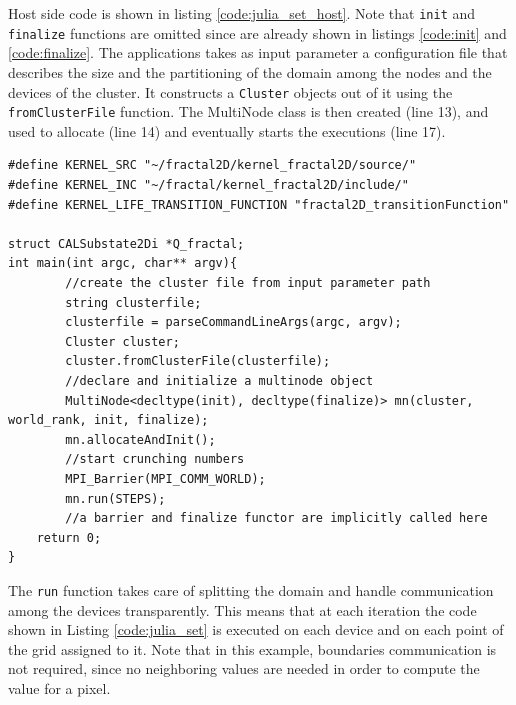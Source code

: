 Host side code is shown in listing \ref{code:julia_set_host}. Note that \texttt{init} and \texttt{finalize} functions are omitted since are already shown in listings \ref{code:init} and \ref{code:finalize}.
The applications takes as input parameter a configuration file that describes the size and the partitioning of the domain among the nodes and the devices of the cluster. It constructs a \texttt{Cluster} objects out of it using the \texttt{fromClusterFile} function.
The MultiNode class is then created (line 13), and used to allocate  (line 14) and eventually starts the executions (line 17).
\begin{lstlisting}
#define KERNEL_SRC "~/fractal2D/kernel_fractal2D/source/"
#define KERNEL_INC "~/fractal/kernel_fractal2D/include/"
#define KERNEL_LIFE_TRANSITION_FUNCTION "fractal2D_transitionFunction"

struct CALSubstate2Di *Q_fractal; 
int main(int argc, char** argv){
		//create the cluster file from input parameter path
		string clusterfile;
		clusterfile = parseCommandLineArgs(argc, argv);
		Cluster cluster;
		cluster.fromClusterFile(clusterfile);
	    //declare and initialize a multinode object
		MultiNode<decltype(init), decltype(finalize)> mn(cluster, world_rank, init, finalize);
		mn.allocateAndInit();
	    //start crunching numbers
		MPI_Barrier(MPI_COMM_WORLD);
		mn.run(STEPS);
		//a barrier and finalize functor are implicitly called here
	return 0;
}

\end{lstlisting}
The \texttt{run} function takes care of splitting the domain and handle communication among the devices transparently. This means that at each iteration the code shown in Listing \ref{code:julia_set} is executed on each device and on each point of the grid assigned to it. Note that in this example, boundaries communication is not required, since no neighboring values are needed in order to compute the value for a pixel.

